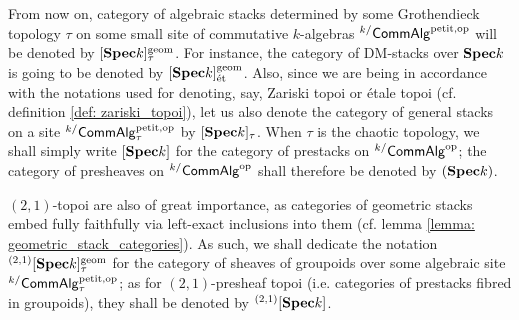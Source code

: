                    \begin{convention} \label{conv: algebraic_stacks_notations}
                        From now on, category of algebraic stacks determined by some Grothendieck topology $\tau$ on some small site of commutative $k$-algebras ${}^{k/}\mathsf{Comm}\mathsf{Alg}^{\mathrm{petit}, \mathrm{op}}$ will be denoted by $[\mathbf{Spec} k]^{\mathrm{geom}}_{\tau}$. For instance, the category of DM-stacks over $\mathbf{Spec} k$ is going to be denoted by $[\mathbf{Spec} k]^{\mathrm{geom}}_{\mathrm{\acute{e}t}}$. Also, since we are being in accordance with the notations used for denoting, say, Zariski topoi or \'etale topoi (cf. definition \ref{def: zariski_topoi}), let us also denote the category of general stacks on a site ${}^{k/}\mathsf{Comm}\mathsf{Alg}^{\mathrm{petit}, \mathrm{op}}_{\tau}$ by $[\mathbf{Spec} k]_{\tau}$. When $\tau$ is the chaotic topology, we shall simply write $[\mathbf{Spec} k]$ for the category of prestacks on ${}^{k/}\mathsf{Comm}\mathsf{Alg}^{\mathrm{op}}$; the category of presheaves on ${}^{k/}\mathsf{Comm}\mathsf{Alg}^{\mathrm{op}}$ shall therefore be denoted by $(\mathbf{Spec} k)$.
                        
                        $(2, 1)$-topoi are also of great importance, as categories of geometric stacks embed fully faithfully via left-exact inclusions into them (cf. lemma \ref{lemma: geometric_stack_categories}). As such, we shall dedicate the notation ${}^{(2, 1)}[\mathbf{Spec} k]^{\mathrm{geom}}_{\tau}$ for the category of sheaves of groupoids over some algebraic site ${}^{k/}\mathsf{Comm}\mathsf{Alg}_{\tau}^{\mathrm{petit}, \mathrm{op}}$; as for $(2, 1)$-presheaf topoi (i.e. categories of prestacks fibred in groupoids), they shall be denoted by ${}^{(2, 1)}[\mathbf{Spec} k]$. 
                    \end{convention}
                
